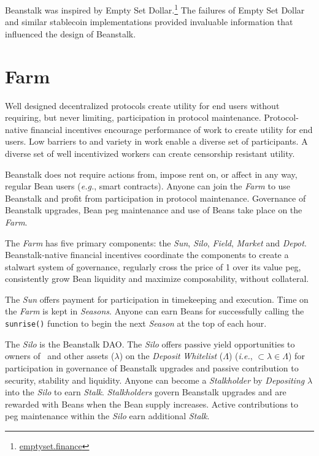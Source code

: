 \documentclass[tikz]{article}
\newcommand{\code}[1]{\texttt{#1}}
\newcommand{\term}[1]{\textsl{#1}}
\newcommand{\fref}[1]{\footnote{\href{http://#1}{#1}}}
\newcommand{\Bean}{} %
\begin{document}
Beanstalk was inspired by Empty Set Dollar.\fref{emptyset.finance} The failures of Empty Set Dollar and similar stablecoin implementations provided invaluable information that influenced the design of Beanstalk.

\section{Farm}
Well designed decentralized protocols create utility for end users without requiring, but never limiting, participation in protocol maintenance. Protocol-native financial incentives encourage performance of work to create utility for end users. Low barriers to and variety in work enable a diverse set of participants. A diverse set of well incentivized workers can create censorship resistant utility. 

Beanstalk does not require actions from, impose rent on, or affect in any way, regular Bean users (\term{e.g.}, smart contracts). Anyone can join the \term{Farm} to use Beanstalk and profit from participation in protocol maintenance. Governance of Beanstalk upgrades, Bean peg maintenance and use of Beans take place on the \term{Farm}.

The \term{Farm} has five primary components: the \term{Sun}, \term{Silo}, \term{Field}, \term{Market} and \term{Depot}. Beanstalk-native financial incentives coordinate the components to create a stalwart system of governance, regularly cross the price of \Bean1 over its value peg, consistently grow Bean liquidity and maximize composability, without collateral.

The \term{Sun} offers payment for participation in timekeeping and execution. Time on the \term{Farm} is kept in \term{Seasons}. Anyone can earn Beans for successfully calling the \code{sunrise()} function to begin the next \term{Season} at the top of each hour.

The \term{Silo} is the Beanstalk DAO. The \term{Silo} offers passive yield opportunities to owners of \Bean\ and other assets ($\lambda$) on the \term{Deposit} \term{Whitelist} ($\Lambda$) (\term{i.e.}, $\Bean \subset \lambda \in \Lambda$) for participation in governance of Beanstalk upgrades and passive contribution to security, stability and liquidity. Anyone can become a \term{Stalkholder} by \term{Depositing} $\lambda$ into the \term{Silo} to earn \term{Stalk}. \term{Stalkholders} govern Beanstalk upgrades and are rewarded with Beans when the Bean supply increases. Active contributions to peg maintenance within the \term{Silo} earn additional \term{Stalk}.
\end{document}
